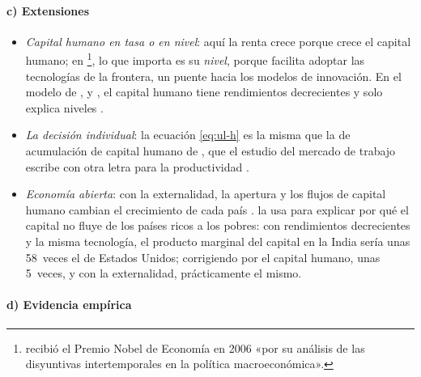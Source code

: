 \documentclass[11pt]{article}
\begin{document}
\paragraph{c) Extensiones}

\begin{itemize}
\item \emph{Capital humano en tasa o en nivel}: aquí la renta crece porque crece el capital humano; en \textcite{NelsonPhelps1966Investment}\footnote{ recibió el Premio Nobel de Economía en 2006 «por su análisis de las disyuntivas intertemporales en la política macroeconómica»\nocite{Nobel2006Phelps}.}, lo que importa es su \emph{nivel}, porque facilita adoptar las tecnologías de la frontera, un puente hacia los modelos de innovación. En el modelo de ,  y , el capital humano tiene rendimientos decrecientes y solo explica niveles .
\item \emph{La decisión individual}: la ecuación \eqref{eq:ul-h} es la misma que la de acumulación de capital humano de , que el estudio del mercado de trabajo escribe con otra letra para la productividad .
\item \emph{Economía abierta}: con la externalidad, la apertura y los flujos de capital humano cambian el crecimiento de cada país . \textcite{Lucas1990Why} la usa para explicar por qué el capital no fluye de los países ricos a los pobres: con rendimientos decrecientes y la misma tecnología, el producto marginal del capital en la India sería unas 58~veces el de Estados Unidos; corrigiendo por el capital humano, unas 5~veces, y con la externalidad, prácticamente el mismo.
\end{itemize}

\paragraph{d) Evidencia empírica}
\end{document}
